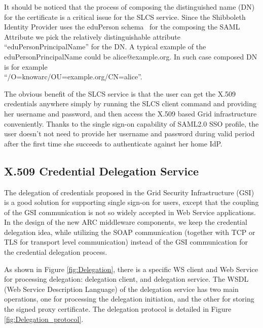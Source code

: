 \documentclass[twocolumn]{svjour3}         %
\begin{document}
It should be noticed that the process of composing the distinguished name (DN) for the certificate is a critical issue for the SLCS service. Since the Shibboleth Identity Provider uses the eduPerson schema~\cite{eduSchemalink} for the composing the SAML Attribute we pick the relatively distinguishable attribute ``eduPersonPrincipalName'' for the DN. A typical example of the eduPersonPrincipalName  could be alice@example.org. In such case composed DN is for example\\``/O=knowarc/OU=example.org/CN=alice''.

The obvious benefit of the SLCS service is that the user can get the X.509 credentials anywhere simply by running the SLCS client command and providing her username and password, and then access the X.509 based Grid infrastructure conveniently. Thanks to the single sign-on capability of SAML2.0 SSO profile, the user doesn't not need to provide her username and password during valid period after the first time she succeeds to authenticate against her home IdP.

\subsection{X.509 Credential Delegation Service}
\label{sec:creddeleg}
The delegation of credentials proposed in the Grid Security Infrastructure (GSI) is a good solution for supporting single sign-on for users, except that the coupling of the GSI communication is not so widely accepted in Web Service applications. In the design of the new ARC middleware components, we keep the credential delegation idea, while utilizing the SOAP communication (together with TCP or TLS for transport level communication) instead of the GSI communication for the credential delegation process.

As shown in Figure \ref{fig:Delegation}, there is a specific WS client and Web Service for processing delegation: delegation client, and delegation service. The WSDL (Web Service Description Language) of the delegation service has two main operations, one for processing the delegation initiation, and the other for storing the signed proxy certificate. The delegation protocol is detailed in Figure \ref{fig:Delegation_protocol}.
\end{document}
